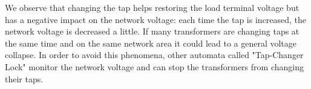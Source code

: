 \documentclass[a4paper, 12pt]{report}
\begin{document}
We observe that changing the tap helps restoring the load terminal voltage but has a negative impact on the network voltage: each time the tap is increased, the network voltage is decreased a little. If many transformers are changing taps at the same time and on the same network area it could lead to a general voltage collapse. In order to avoid this phenomena, other automata called "Tap-Changer Lock" monitor the network voltage and can stop the transformers from changing their taps.
\end{document}
